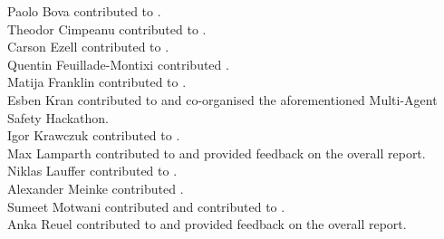 {Paolo Bova} contributed to .\\
{Theodor Cimpeanu} contributed to .\\
{Carson Ezell} contributed to .\\
{Quentin Feuillade-Montixi} contributed .\\
{Matija Franklin} contributed to .\\
{Esben Kran} contributed to  and co-organised the aforementioned Multi-Agent Safety Hackathon.\\
{Igor Krawczuk} contributed to .\\
{Max Lamparth} contributed to  and provided feedback on the overall report.\\
{Niklas Lauffer} contributed to .\\
{Alexander Meinke} contributed .\\
{Sumeet Motwani} contributed  and contributed to .\\
{Anka Reuel} contributed to  and provided feedback on the overall report.

